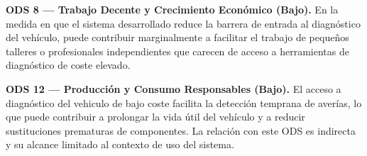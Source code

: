 \textbf{ODS 8 — Trabajo Decente y Crecimiento Económico (Bajo).} En la medida en que el sistema desarrollado reduce la barrera de entrada al diagnóstico del vehículo, puede contribuir marginalmente a facilitar el trabajo de pequeños talleres o profesionales independientes que carecen de acceso a herramientas de diagnóstico de coste elevado.

\textbf{ODS 12 — Producción y Consumo Responsables (Bajo).} El acceso a diagnóstico del vehiculo de bajo coste facilita la detección temprana de averías, lo que puede contribuir a prolongar la vida útil del vehículo y a reducir sustituciones prematuras de componentes. La relación con este ODS es indirecta y su alcance limitado al contexto de uso del sistema.
